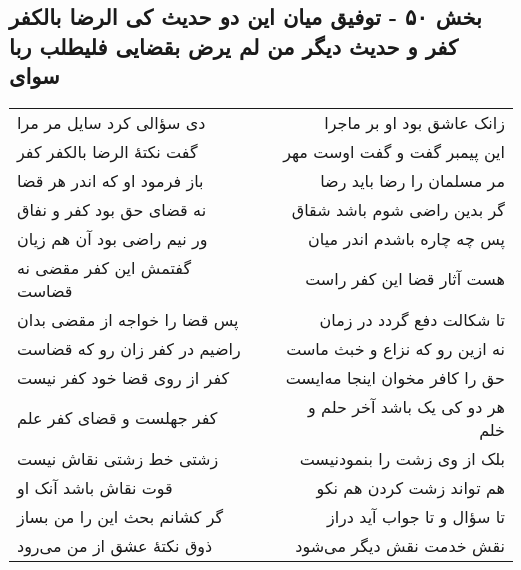 \begin{center}
\section*{بخش ۵۰ - توفیق میان این دو حدیث کی الرضا بالکفر کفر و حدیث دیگر من لم یرض بقضایی  فلیطلب ربا سوای}
\label{sec:sh050}
\begin{longtable}{l p{0.5cm} r}
دی سؤالی کرد سایل مر مرا
&&
زانک عاشق بود او بر ماجرا
\\
گفت نکتهٔ الرضا بالکفر کفر
&&
این پیمبر گفت و گفت اوست مهر
\\
باز فرمود او که اندر هر قضا
&&
مر مسلمان را رضا باید رضا
\\
نه قضای حق بود کفر و نفاق
&&
گر بدین راضی شوم باشد شقاق
\\
ور نیم راضی بود آن هم زیان
&&
پس چه چاره باشدم اندر میان
\\
گفتمش این کفر مقضی نه قضاست
&&
هست آثار قضا این کفر راست
\\
پس قضا را خواجه از مقضی بدان
&&
تا شکالت دفع گردد در زمان
\\
راضیم در کفر زان رو که قضاست
&&
نه ازین رو که نزاع و خبث ماست
\\
کفر از روی قضا خود کفر نیست
&&
حق را کافر مخوان اینجا مه‌ایست
\\
کفر جهلست و قضای کفر علم
&&
هر دو کی یک باشد آخر حلم و خلم
\\
زشتی خط زشتی نقاش نیست
&&
بلک از وی زشت را بنمودنیست
\\
قوت نقاش باشد آنک او
&&
هم تواند زشت کردن هم نکو
\\
گر کشانم بحث این را من بساز
&&
تا سؤال و تا جواب آید دراز
\\
ذوق نکتهٔ عشق از من می‌رود
&&
نقش خدمت نقش دیگر می‌شود
\\
\end{longtable}
\end{center}
